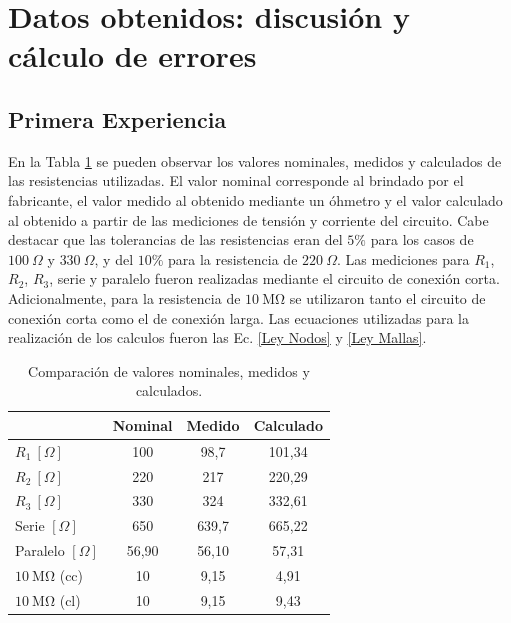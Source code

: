 \pgfplotsset{compat=1.18}

\section{Datos obtenidos: discusión y cálculo de errores}

\subsection{Primera Experiencia}
En la Tabla \ref{tab:resistencias} se pueden observar los valores nominales, medidos y calculados de las resistencias utilizadas. El valor nominal corresponde al brindado por el fabricante, el valor medido al obtenido mediante un óhmetro y el valor calculado al obtenido a partir de las mediciones de tensión y corriente del circuito. Cabe destacar que las tolerancias de las resistencias eran del $5\%$ para los casos de $100\ \Omega$ y $330\ \Omega$, y del $10\%$ para la resistencia de $220\ \Omega$. Las mediciones para $R_1$, $R_2$, $R_3$, serie y paralelo fueron realizadas mediante el circuito de conexión corta. Adicionalmente, para la resistencia de $10\ \mathrm{M\Omega}$ se utilizaron tanto el circuito de conexión corta como el de conexión larga.
Las ecuaciones utilizadas para la realización de los calculos fueron las Ec. \ref{Ley Nodos} y \ref{Ley Mallas}.


\begin{table}[H]
\centering
\small
\begin{tabular}{|l|c|c|c|}
\hline
\rowcolor{blue!30} \textbf{} & \textbf{Nominal} & \textbf{Medido} & \textbf{Calculado} \\
\hline
$R_1\ [\Omega]$             & 100   & 98,7  & 101,34 \\
$R_2\ [\Omega]$             & 220   & 217   & 220,29 \\
$R_3\ [\Omega]$             & 330   & 324   & 332,61 \\
Serie $[\Omega]$            & 650   & 639,7 & 665,22 \\
Paralelo $[\Omega]$         & 56,90 & 56,10 & 57,31  \\
$10\ \mathrm{M\Omega}$ (cc) & 10    & 9,15  & 4,91   \\
$10\ \mathrm{M\Omega}$ (cl) & 10    & 9,15  & 9,43   \\
\hline
\end{tabular}
\caption{Comparación de valores nominales, medidos y calculados.}
\label{tab:resistencias}
\end{table}

